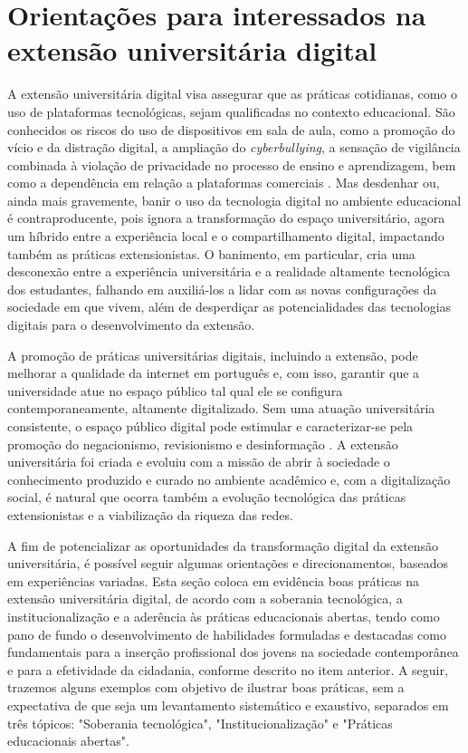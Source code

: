 \documentclass[portuguese]{textolivre}
\begin{document}
\section{Orientações para interessados na extensão universitária digital}

A extensão universitária digital visa assegurar que as práticas
cotidianas, como o uso de plataformas tecnológicas, sejam qualificadas
no contexto educacional. São conhecidos os riscos do uso de dispositivos
em sala de aula, como a promoção do vício e da distração digital, a
ampliação do \emph{cyberbullying}, a sensação de vigilância combinada à
violação de privacidade no processo de ensino e aprendizagem, bem como a
dependência em relação a plataformas comerciais \cite{Selwyn2020}. Mas
desdenhar ou, ainda mais gravemente, banir o uso da tecnologia digital
no ambiente educacional é contraproducente, pois ignora a transformação
do espaço universitário, agora um híbrido entre a experiência local e o
compartilhamento digital, impactando também as práticas extensionistas.
O banimento, em particular, cria uma desconexão entre a experiência
universitária e a realidade altamente tecnológica dos estudantes,
falhando em auxiliá-los a lidar com as novas configurações da sociedade
em que vivem, além de desperdiçar as potencialidades das tecnologias
digitais para o desenvolvimento da extensão.

A promoção de práticas universitárias digitais, incluindo a extensão,
pode melhorar a qualidade da internet em português e, com isso, garantir
que a universidade atue no espaço público tal qual ele se configura
contemporaneamente, altamente digitalizado. Sem uma atuação
universitária consistente, o espaço público digital pode estimular e
caracterizar-se pela promoção do negacionismo, revisionismo e
desinformação \cite{Anthonysamy2022, Ciampaglia2018}. A extensão
universitária foi criada e evoluiu com a missão de abrir à sociedade o
conhecimento produzido e curado no ambiente acadêmico e, com a
digitalização social, é natural que ocorra também a evolução tecnológica
das práticas extensionistas e a viabilização da riqueza das redes.

A fim de potencializar as oportunidades da transformação digital da
extensão universitária, é possível seguir algumas orientações e
direcionamentos, baseados em experiências variadas. Esta seção coloca em
evidência boas práticas na extensão universitária digital, de acordo com
a soberania tecnológica, a institucionalização e a aderência às práticas
educacionais abertas, tendo como pano de fundo o desenvolvimento de
habilidades formuladas e destacadas como fundamentais para a inserção
profissional dos jovens na sociedade contemporânea e para a efetividade
da cidadania, conforme descrito no item anterior. A seguir, trazemos
alguns exemplos com objetivo de ilustrar boas práticas, sem a
expectativa de que seja um levantamento sistemático e exaustivo,
separados em três tópicos: "Soberania tecnológica",
"Institucionalização" e "Práticas educacionais abertas".
\end{document}
